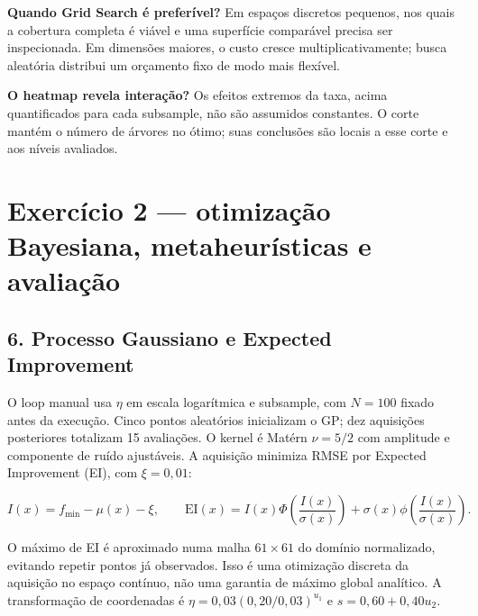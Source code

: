 \documentclass[12pt,a4paper]{article}
\begin{document}
\textbf{Quando Grid Search é preferível?} Em espaços discretos pequenos, nos quais a cobertura completa é viável e uma superfície comparável precisa ser inspecionada. Em dimensões maiores, o custo cresce multiplicativamente; busca aleatória distribui um orçamento fixo de modo mais flexível\cite{bergstra}.

\textbf{O heatmap revela interação?} Os efeitos extremos da taxa, acima quantificados para cada subsample, não são assumidos constantes. O corte mantém o número de árvores no ótimo; suas conclusões são locais a esse corte e aos níveis avaliados.

\section{Exercício 2 — otimização Bayesiana, metaheurísticas e avaliação}

\subsection{6. Processo Gaussiano e Expected Improvement}

O loop manual usa $\eta$ em escala logarítmica e subsample, com $N=100$ fixado antes da execução. Cinco pontos aleatórios inicializam o GP; dez aquisições posteriores totalizam 15 avaliações. O kernel é Matérn $\nu=5/2$ com amplitude e componente de ruído ajustáveis\cite{gp}. A aquisição minimiza RMSE por Expected Improvement (EI), com $\xi=0{,}01$:

\[ I(x)=f_{\min}-\mu(x)-\xi,\qquad\mathrm{EI}(x)=I(x)\Phi\!\left(\frac{I(x)}{\sigma(x)}\right)+\sigma(x)\phi\!\left(\frac{I(x)}{\sigma(x)}\right).\]

O máximo de EI é aproximado numa malha $61\times61$ do domínio normalizado, evitando repetir pontos já observados. Isso é uma otimização discreta da aquisição no espaço contínuo, não uma garantia de máximo global analítico. A transformação de coordenadas é $\eta=0{,}03(0{,}20/0{,}03)^{u_1}$ e $s=0{,}60+0{,}40u_2$.
\end{document}
